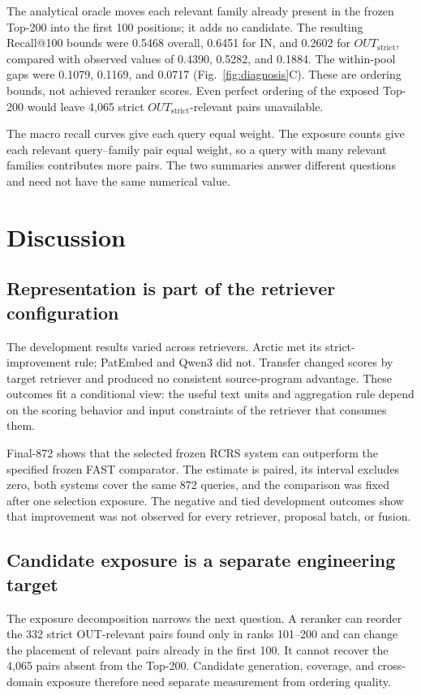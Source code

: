 \documentclass[final,5p,times,twocolumn]{elsarticle}
\begin{document}
The analytical oracle moves each relevant family already present in the
frozen Top-200 into the first 100 positions; it adds no candidate. The
resulting Recall@100 bounds were 0.5468 overall, 0.6451 for IN, and 0.2602 for
\ensuremath{OUT_{\mathrm{strict}}}, compared with observed values of 0.4390, 0.5282, and 0.1884. The
within-pool gaps were 0.1079, 0.1169, and 0.0717
(Fig.~\ref{fig:diagnosis}C). These are ordering bounds, not achieved reranker
scores. Even perfect ordering of the exposed Top-200 would leave 4,065 strict
\ensuremath{OUT_{\mathrm{strict}}}-relevant pairs unavailable.

The macro recall curves give each query equal weight. The exposure counts give
each relevant query--family pair equal weight, so a query with many relevant
families contributes more pairs. The two summaries answer different questions
and need not have the same numerical value.

\section{Discussion}

\subsection{Representation is part of the retriever configuration}

The development results varied across retrievers.
Arctic met its strict-improvement rule; PatEmbed and Qwen3 did not. Transfer
changed scores by target retriever and produced no consistent source-program
advantage. These outcomes fit a conditional view: the useful text units and
aggregation rule depend on the scoring behavior and input constraints of the
retriever that consumes them.

Final-872 shows that the selected frozen RCRS system can outperform the
specified frozen FAST comparator. The estimate is
paired, its interval excludes zero, both systems cover the same 872 queries,
and the comparison was fixed after one selection exposure. The negative and
tied development outcomes show that improvement was not observed for every
retriever, proposal batch, or fusion.

\subsection{Candidate exposure is a separate engineering target}

The exposure decomposition narrows the next question. A reranker can reorder the
332 strict OUT-relevant pairs found only in ranks 101--200 and can change the
placement of relevant pairs already in the first 100. It cannot recover the
4,065 pairs absent from the Top-200. Candidate generation, coverage, and
cross-domain exposure therefore need separate measurement from ordering
quality.
\end{document}
